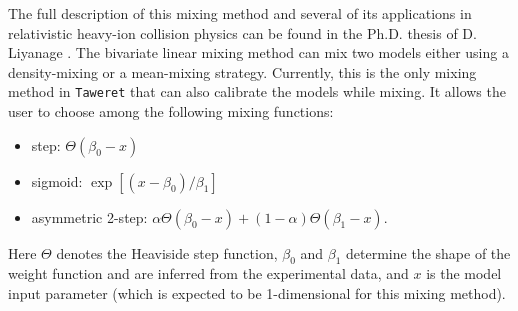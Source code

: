 \documentclass[10pt, preprint,aps,prc,floatfix,
tightenlines,
nofootinbib,superscriptaddress]{revtex4-2}
\begin{document}
The full description of this mixing method and several of its applications in relativistic heavy-ion collision physics can be found in the Ph.D. thesis of D. Liyanage \cite{Liyanage_thesis}. The bivariate linear mixing method can mix two models either using a density-mixing or a mean-mixing strategy. Currently, this is the only mixing method in \texttt{Taweret} that can also calibrate the models while mixing. It allows the user to choose among the following mixing functions:
\begin{itemize}[nosep]
    \item step: $\Theta(\beta_0-x)$
    \item sigmoid: $\exp\left[(x-\beta_0)/\beta_1\right]$
    \item asymmetric 2-step: $\alpha \Theta(\beta_0-x) + (1-\alpha)\Theta(\beta_1-x)$.
\end{itemize}
Here $\Theta$ denotes the Heaviside step function, $\beta_0$ and $\beta_1$ determine the shape of the weight function and are inferred from the experimental data, and  $x$ is the model input parameter (which is expected to be 1-dimensional for this mixing method).

\end{document}
